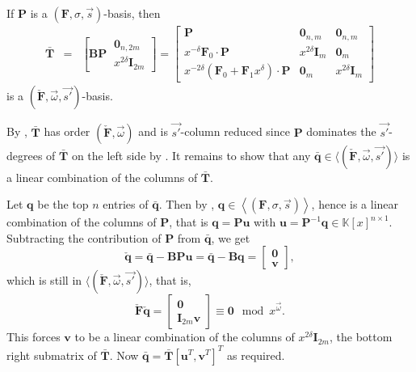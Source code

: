 \begin{lem}
\label{lem:FtoAbasis}If $\mathbf{P}$ is a $\left(\mathbf{F},\sigma,\vec{s}\right)$-basis,
then \begin{eqnarray*}
\bar{\mathbf{T}} & = & \left[\mathbf{B}\mathbf{P}~\begin{array}{|c}
\mathbf{0}_{n,2m}\\
x^{2\delta}\mathbf{I}_{2m}\end{array}\right]=\left[\begin{array}{r|cc}
\mathbf{P} & \mathbf{0}_{n,m} & \mathbf{0}_{n,m}\\
\hline x^{-\delta}\mathbf{F}_{0}\cdot\mathbf{P} & x^{2\delta}\mathbf{I}_{m} & \mathbf{0}_{m}\\
x^{-2\delta}\left(\mathbf{F}_{0}+\mathbf{F}_{1}x^{\delta}\right)\cdot\mathbf{P} & \mathbf{0}_{m} & x^{2\delta}\mathbf{I}_{m}\end{array}\right]\end{eqnarray*}
 is a $(\check{\mathbf{F}},\vec{\omega},\vec{s'})$-basis.\end{lem}
\begin{pf}
By , $\bar{\mathbf{T}}$ has order $(\check{\mathbf{F}},\vec{\omega})$
and is $\vec{s'}$-column reduced since $\mathbf{P}$ dominates the
$\vec{s'}$-degrees of $\bar{\mathbf{T}}$ on the left side by .
It remains to show that any $\bar{\mathbf{q}}\in\langle(\check{\mathbf{F}},\vec{\omega},\vec{s'})\rangle$
is a linear combination of the columns of $\mathbf{\bar{\mathbf{T}}}$.

Let $\mathbf{q}$ be the top $n$ entries of $\bar{\mathbf{q}}$.
Then by , $\mathbf{q}\in\left\langle \left(\mathbf{F},\sigma,\vec{s}\right)\right\rangle $,
hence is a linear combination of the columns of $\mathbf{P}$, that
is $\mathbf{q}=\mathbf{P}\mathbf{u}$ with $\mathbf{u}=\mathbf{P}^{-1}\mathbf{q}\in\mathbb{K}\left[x\right]^{n\times1}$.
Subtracting the contribution of $\mathbf{P}$ from $\bar{\mathbf{q}}$,
we get \[
\check{\mathbf{q}}=\bar{\mathbf{q}}-\mathbf{B}\mathbf{P}\mathbf{u}=\bar{\mathbf{q}}-\mathbf{B}\mathbf{q}=\left[\begin{array}{c}
\mathbf{0}\\
\mathbf{v}\end{array}\right],\]
 which is still in $\langle(\check{\mathbf{F}},\vec{\omega},\vec{s'})\rangle$,
that is, \[
\check{\mathbf{F}}\check{\mathbf{q}}=\begin{bmatrix}\mathbf{0}\\
\mathbf{I}_{2m}\mathbf{v}\end{bmatrix}\equiv\mathbf{0}\mod x^{\vec{\omega}}.\]
 This forces $\mathbf{v}$ to be a linear combination of the columns
of $x^{2\delta}\mathbf{I}_{2m}$, the bottom right submatrix of $\bar{\mathbf{T}}$.
Now $\bar{\mathbf{q}}=\bar{\mathbf{T}}\left[\mathbf{u}^{T},\mathbf{v}^{T}\right]^{T}$
as required.\end{pf}
